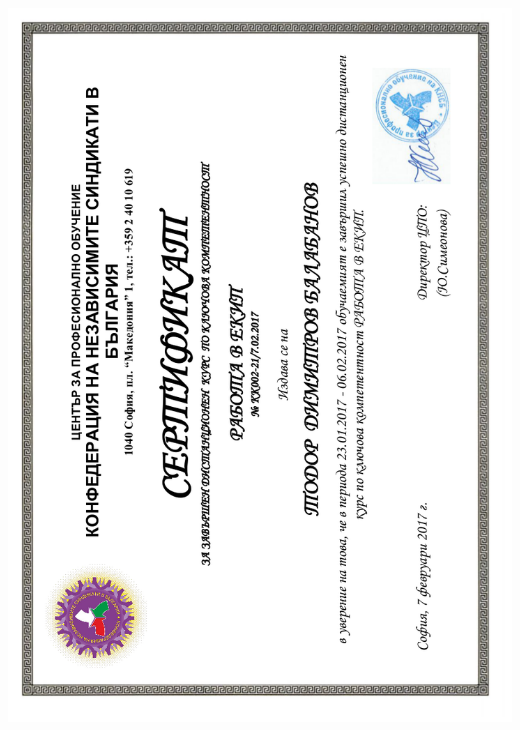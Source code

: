 \documentclass[english,a4paper]{europasscv}
\begin{document}
\includegraphics[width=\textwidth,height=\textheight,keepaspectratio]{KNSB2017_1}
\end{document}

